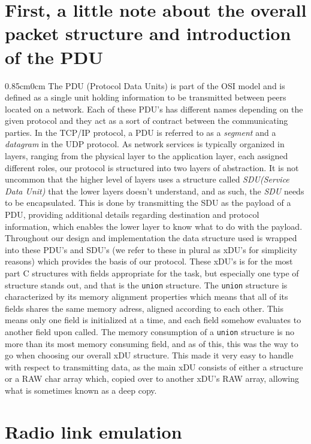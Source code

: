 \documentclass{article}
\newcommand{\code}[1]{\texttt{#1}}
\newcommand{\tWidth}{0.85cm}
\newcommand{\iPar}[1]{\begin{adjustwidth}{\tWidth}{0cm} #1 \end{adjustwidth}
}
\begin{document}
	\section{First, a little note about the overall packet structure and introduction of the PDU}
	\iPar{
	The PDU (Protocol Data Units) is part of the OSI model and is defined as a single unit holding information to be transmitted between peers located on a network. Each of these PDU's has different names depending on the given protocol and they act as a sort of contract between the communicating parties. In the TCP/IP protocol, a PDU is referred to as a \textit{segment} and a \textit{datagram} in the UDP protocol. As network services is typically organized in layers, ranging from the physical layer to the application layer, each assigned different roles, our protocol is structured into two layers of abstraction. It is not uncommon that the higher level of layers uses a structure called \textit{SDU(Service Data Unit)} that the lower layers doesn't understand, and as such, the \textit{SDU} needs to be encapsulated. This is done by transmitting the SDU as the payload of a PDU, providing additional details regarding destination and protocol information, which enables the lower layer to know what to do with the payload\cite{PDU}.\\
	
	Throughout our design and implementation the data structure used is wrapped into these PDU's  and SDU's (we refer to these in plural as xDU's for simplicity reasons) which provides the basis of our protocol. These xDU's is for the most part C structures with fields appropriate for the task, but especially one type of structure stands out, and that is the \code{union} structure. The \code{union} structure is characterized by its memory alignment properties which means that all of its fields shares the same memory adress, aligned according to each other. This means only one field is initialized at a time, and each field somehow evaluates to another field upon called. The memory consumption of a \code{union} structure is no more than its most memory consuming field, and as of this, this was the way to go when choosing our overall xDU structure. This made it very easy to handle with respect to transmitting data, as the main xDU consists of either a structure or a RAW char array which, copied over to another xDU's RAW array, allowing what is sometimes known as a deep copy.}
	
	\section{Radio link emulation}
	
\end{document}
